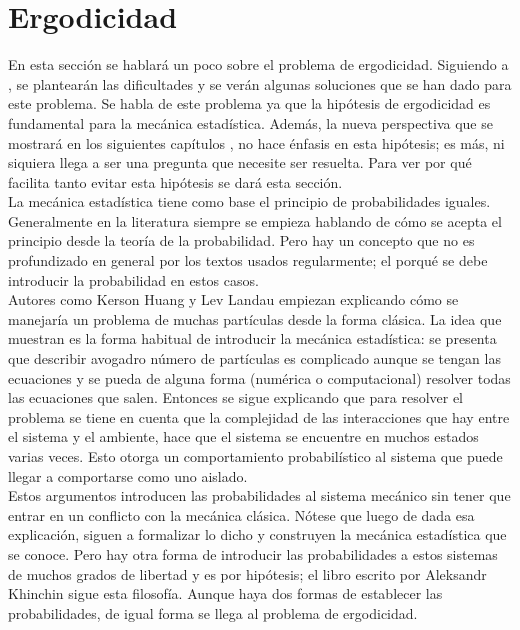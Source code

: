\section{Ergodicidad}
En esta sección se hablará un poco sobre el problema de ergodicidad. Siguiendo a \cite{TodaStat}, se plantearán las dificultades y se verán algunas soluciones que se han dado para este problema. Se habla de este problema ya que la hipótesis de ergodicidad es fundamental para la mecánica estadística. Además, la nueva perspectiva que se mostrará en los siguientes capítulos \cite{Popescu2006}, no hace énfasis en esta hipótesis; es más, ni siquiera llega a ser una pregunta que necesite ser resuelta. Para ver por qué facilita tanto evitar esta hipótesis se dará esta sección.
\\
La mecánica estadística tiene como base el principio de probabilidades iguales. Generalmente en la literatura siempre se empieza hablando de cómo se acepta el principio desde la teoría de la probabilidad. Pero hay un concepto que no es profundizado en general por los textos usados regularmente; el porqué se debe introducir la probabilidad en estos casos.\\
Autores como Kerson Huang y Lev Landau empiezan explicando cómo se manejaría un problema de muchas partículas desde la forma clásica. La idea que muestran es la forma habitual de introducir la mecánica estadística: se presenta que describir avogadro número de partículas es complicado aunque se tengan las ecuaciones y se pueda de alguna forma (numérica o computacional) resolver todas las ecuaciones que salen. Entonces se sigue explicando que para resolver el problema se tiene en cuenta que la complejidad de las interacciones que hay entre el sistema y el ambiente, hace que el sistema se encuentre en muchos estados varias veces. Esto otorga un comportamiento probabilístico al sistema que puede llegar a comportarse como uno aislado.
\\ 
Estos argumentos introducen las probabilidades al sistema mecánico sin tener que entrar en un conflicto con la mecánica clásica. Nótese que luego de dada esa explicación, siguen a formalizar lo dicho y construyen la mecánica estadística que se conoce. Pero hay otra forma de introducir las probabilidades a estos sistemas de muchos grados de libertad y es por hipótesis; el libro escrito por Aleksandr Khinchin \cite{KhinchinStat} sigue esta filosofía. Aunque haya dos formas de establecer las probabilidades, de igual forma se llega al problema de ergodicidad. 
\\
